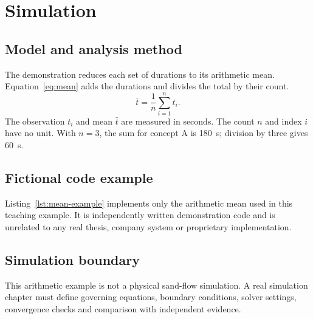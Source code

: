 \chapter{Simulation}
\label{chap:simulation}

\section{Model and analysis method}
\label{sec:methodology}
The demonstration reduces each set of durations to its arithmetic mean.
Equation~\ref{eq:mean} adds the durations and divides the total by their count.
\begin{equation}
\bar{t}=\frac{1}{n}\sum_{i=1}^{n}t_i .
\label{eq:mean}
\end{equation}
The observation $t_i$ and mean $\bar{t}$ are measured in seconds.
The count $n$ and index $i$ have no unit. With $n=3$, the sum for concept A
is \qty{180}{\second}; division by three gives \qty{60}{\second}.

\section{Fictional code example}
\label{sec:code-example}
Listing~\ref{lst:mean-example} implements only the arithmetic mean used in this
teaching example. It is independently written demonstration code and is unrelated
to any real thesis, company system or proprietary implementation.



\section{Simulation boundary}
This arithmetic example is not a physical sand-flow simulation. A real simulation
chapter must define governing equations, boundary conditions, solver settings,
convergence checks and comparison with independent evidence.
